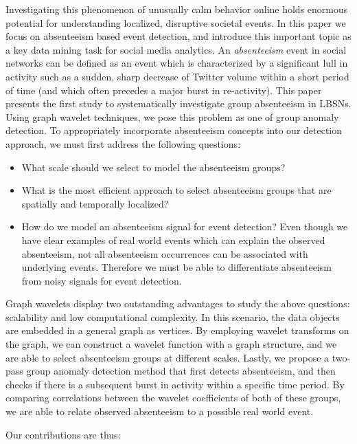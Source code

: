 Investigating this phenomenon of unusually calm behavior online holds enormous potential for understanding localized, disruptive societal events.
In this paper we focus on absenteeism based event detection, and introduce this important topic as a key data mining
task for social media analytics.
An \textit{absenteeism} event in social networks can be defined as an event which is characterized by a significant lull in activity such as a sudden, sharp decrease of Twitter volume within a short period of time (and which  often precedes a major burst in re-activity).
This paper presents the first study to systematically investigate group absenteeism in LBSNs.
Using graph wavelet techniques, we pose this problem as one of group anomaly detection.
To appropriately incorporate absenteeism concepts into our detection approach, we must first address the following questions:

\begin{itemize}
\item What scale should we select to model the absenteeism groups? %
    
\item What is the most efficient approach to select absenteeism groups that are spatially and temporally localized?
    
\item How do we model an absenteeism signal for event detection? Even though we have clear examples of real world events which can explain the observed absenteeism, not all absenteeism occurrences can be associated with underlying events. Therefore we must be able to differentiate absenteeism from noisy signals for event detection.
\end{itemize}

Graph wavelets display two outstanding advantages to study the above
questions: scalability and low computational complexity.
In this scenario, the data objects are embedded in a general graph as vertices.
By employing wavelet transforms on the graph, we can construct a wavelet function with a graph structure, and we are able to select absenteeism groups at different scales.
Lastly, we propose a two-pass group anomaly detection method that first detects absenteeism, and then checks if there is a subsequent burst in activity within a specific time period.
By comparing correlations between the wavelet coefficients of both of these groups, we are able to relate observed absenteeism to a possible real world event.

Our contributions are thus:

